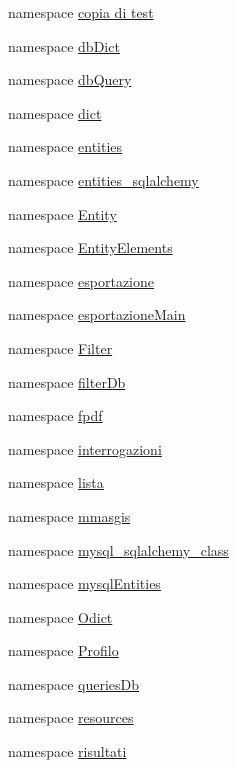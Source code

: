 \begin{DoxyCompactItemize}
\item 
namespace \hyperlink{namespacemmasgis_1_1copia_01di_01test}{copia di test}
\item 
namespace \hyperlink{namespacemmasgis_1_1dbDict}{dbDict}
\item 
namespace \hyperlink{namespacemmasgis_1_1dbQuery}{dbQuery}
\item 
namespace \hyperlink{namespacemmasgis_1_1dict}{dict}
\item 
namespace \hyperlink{namespacemmasgis_1_1entities}{entities}
\item 
namespace \hyperlink{namespacemmasgis_1_1entities__sqlalchemy}{entities\_\-sqlalchemy}
\item 
namespace \hyperlink{namespacemmasgis_1_1Entity}{Entity}
\item 
namespace \hyperlink{namespacemmasgis_1_1EntityElements}{EntityElements}
\item 
namespace \hyperlink{namespacemmasgis_1_1esportazione}{esportazione}
\item 
namespace \hyperlink{namespacemmasgis_1_1esportazioneMain}{esportazioneMain}
\item 
namespace \hyperlink{namespacemmasgis_1_1Filter}{Filter}
\item 
namespace \hyperlink{namespacemmasgis_1_1filterDb}{filterDb}
\item 
namespace \hyperlink{namespacemmasgis_1_1fpdf}{fpdf}
\item 
namespace \hyperlink{namespacemmasgis_1_1interrogazioni}{interrogazioni}
\item 
namespace \hyperlink{namespacemmasgis_1_1lista}{lista}
\item 
namespace \hyperlink{namespacemmasgis_1_1mmasgis}{mmasgis}
\item 
namespace \hyperlink{namespacemmasgis_1_1mysql__sqlalchemy__class}{mysql\_\-sqlalchemy\_\-class}
\item 
namespace \hyperlink{namespacemmasgis_1_1mysqlEntities}{mysqlEntities}
\item 
namespace \hyperlink{namespacemmasgis_1_1Odict}{Odict}
\item 
namespace \hyperlink{namespacemmasgis_1_1Profilo}{Profilo}
\item 
namespace \hyperlink{namespacemmasgis_1_1queriesDb}{queriesDb}
\item 
namespace \hyperlink{namespacemmasgis_1_1resources}{resources}
\item 
namespace \hyperlink{namespacemmasgis_1_1risultati}{risultati}
\item 

\end{DoxyCompactItemize}

